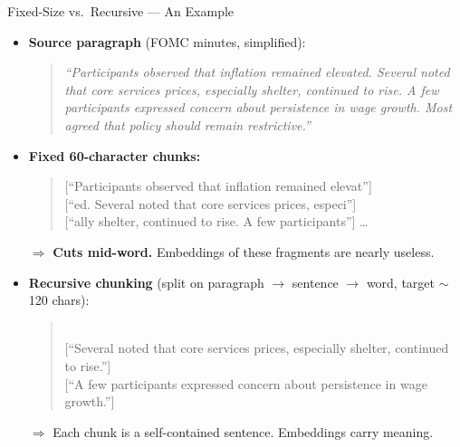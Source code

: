 \begin{frame}{Fixed-Size vs.\ Recursive --- An Example}
\begin{itemize}
\item \textbf{Source paragraph} (FOMC minutes, simplified):
\begin{quote}
\small\itshape
``Participants observed that inflation remained elevated. Several noted that core services prices, especially shelter, continued to rise. A few participants expressed concern about persistence in wage growth. Most agreed that policy should remain restrictive.''
\end{quote}

\medskip
\item \textbf{Fixed 60-character chunks:}
\begin{quote}
\small\ttfamily
{[}``Participants observed that inflation remained elevat''] \\
{[}``ed. Several noted that core services prices, especi''] \\
{[}``ally shelter, continued to rise. A few participants''] \dots
\end{quote}
$\Rightarrow$ \textbf{Cuts mid-word.} Embeddings of these fragments are nearly useless.

\medskip
\item \textbf{Recursive chunking} (split on paragraph $\to$ sentence $\to$ word, target $\sim$120 chars):
\begin{quote}
\small{} \\
{[}``Several noted that core services prices, especially shelter, continued to rise.''] \\
{[}``A few participants expressed concern about persistence in wage growth.'']
\end{quote}
$\Rightarrow$ Each chunk is a self-contained sentence. Embeddings carry meaning.
\end{itemize}
\end{frame}

